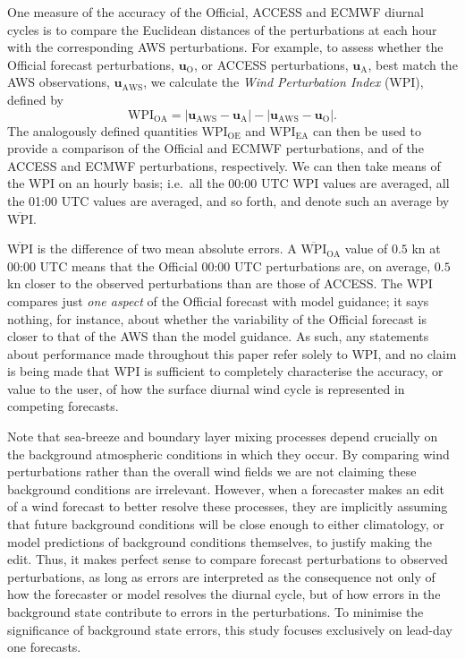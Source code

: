 \documentclass{ametsoc}
\begin{document}
One measure of the accuracy of the Official, ACCESS and ECMWF diurnal cycles is to compare the Euclidean distances of the perturbations at each hour with the corresponding AWS perturbations. For example, to assess whether the Official forecast perturbations, $\boldsymbol{u}_{\text{O}}$, or ACCESS perturbations, $\boldsymbol{u}_{\text{A}}$, best match the AWS observations, $\boldsymbol{u}_{\text{AWS}}$, we calculate the \textit{Wind Perturbation Index} (WPI), defined by 
\begin{equation}
\text{WPI}_\text{OA} = \left\lvert \boldsymbol{u}_{\text{AWS}}-\boldsymbol{u}_{\text{A}} \right\rvert - \left\lvert \boldsymbol{u}_{\text{AWS}}-\boldsymbol{u}_{\text{O}} \right\rvert. \label{Eq:WPI}
\end{equation} 
The analogously defined quantities $\text{WPI}_\text{OE}$ and $\text{WPI}_\text{EA}$ can then be used to provide a comparison of the Official and ECMWF perturbations, and of the ACCESS and ECMWF perturbations, respectively. We can then take means of the WPI on an hourly basis; i.e.~all the 00:00 UTC WPI values are averaged, all the 01:00 UTC values are averaged, and so forth, and denote such an average by $\overline{\text{WPI}}$. 

$\overline{\text{WPI}}$ is the difference of two mean absolute errors. A $\overline{\text{WPI}}_\text{OA}$ value of $0.5$ kn at 00:00 UTC means that the Official 00:00 UTC perturbations are, on average, $0.5$ kn closer to the observed perturbations than are those of ACCESS. The $\text{WPI}$ compares just \textit{one aspect} of the Official forecast with model guidance; it says nothing, for instance, about whether the variability of the Official forecast is closer to that of the AWS than the model guidance. As such, any statements about performance made throughout this paper refer solely to WPI, and no claim is being made that WPI is sufficient to completely characterise the accuracy, or value to the user, of how the surface diurnal wind cycle is represented in competing forecasts.

Note that sea-breeze and boundary layer mixing processes depend crucially on the background atmospheric conditions in which they occur. By comparing wind perturbations rather than the overall wind fields we are not claiming these background conditions are irrelevant. However, when a forecaster makes an edit of a wind forecast to better resolve these processes, they are implicitly assuming that future background conditions will be close enough to either climatology, or model predictions of background conditions themselves, to justify making the edit. Thus, it makes perfect sense to compare forecast perturbations to observed perturbations, as long as errors are interpreted as the consequence not only of how the forecaster or model resolves the diurnal cycle, but of how errors in the background state contribute to errors in the perturbations. To minimise the significance of background state errors, this study focuses exclusively on lead-day one forecasts.
\end{document}

